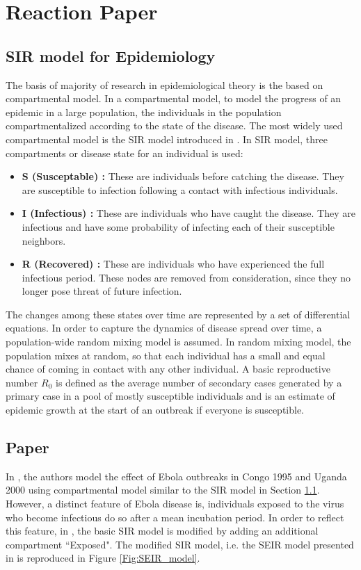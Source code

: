 \documentclass[12pt, journal,onecolumn]{IEEEtran}
\begin{document}
\section{Reaction Paper}
\label{sec:ReactionPaper}
\subsection{SIR model for Epidemiology}
\label{SubSec:SIR}
The basis of majority of research in epidemiological theory is the based on compartmental model. In a compartmental model, to model the progress of an epidemic in a large population, the individuals in the population compartmentalized according to the state of the disease. The most widely used compartmental model is the SIR model introduced in \cite{very_old_paper}. In SIR model, three compartments or disease state for an individual is used:

\begin{itemize}
\item \textbf{S (Susceptable) : } These are individuals before catching the disease. They are susceptible to infection following a contact with infectious individuals.
\item \textbf{I (Infectious) : }These are individuals who have caught the disease. They are infectious and have some probability of infecting each of their susceptible neighbors.
\item \textbf{R (Recovered) : }These are individuals who have experienced the full infectious period. These nodes are removed from consideration, since they no longer pose threat of future infection.
\end{itemize}

The changes among these states over time are represented by a set of differential equations. In order to capture the dynamics of disease spread over time, a population-wide random mixing model is assumed. In random mixing model, the population mixes at random, so that each individual has a small and equal chance of coming in contact with any other individual. A basic reproductive number $R_0$ is defined as the average number of secondary cases generated by a primary case in a pool of mostly susceptible individuals and is an estimate of epidemic growth at the start of an outbreak if everyone is susceptible.


\subsection{Paper \cite{chowell2004basic}}
In  \cite{chowell2004basic}, the authors model the effect of Ebola outbreaks in Congo 1995 and Uganda 2000 using compartmental model similar to the SIR model in Section \ref{SubSec:SIR}. However, a distinct feature of Ebola disease is, individuals exposed to the virus who become infectious do so after a mean incubation period. In order to reflect this feature, in \cite{chowell2004basic}, the basic SIR model is modified by adding an additional compartment ``Exposed". The modified SIR model, i.e. the SEIR model presented in  \cite{chowell2004basic} is reproduced in Figure \ref{Fig:SEIR_model}.
\end{document}
